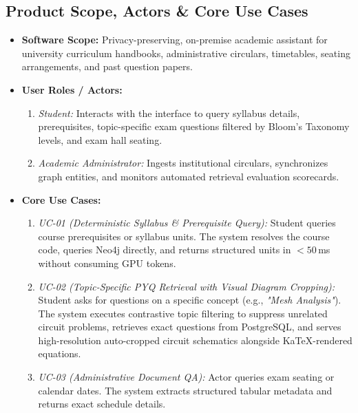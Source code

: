 \documentclass[11pt, a4paper]{article}
\begin{document}
\subsection{Product Scope, Actors \& Core Use Cases}
\begin{itemize}[noitemsep, topsep=2pt]
    \item \textbf{Software Scope:} Privacy-preserving, on-premise academic assistant for university curriculum handbooks, administrative circulars, timetables, seating arrangements, and past question papers.
    \item \textbf{User Roles / Actors:}
    \begin{enumerate}[noitemsep]
        \item \textit{Student:} Interacts with the interface to query syllabus details, prerequisites, topic-specific exam questions filtered by Bloom's Taxonomy levels, and exam hall seating.
        \item \textit{Academic Administrator:} Ingests institutional circulars, synchronizes graph entities, and monitors automated retrieval evaluation scorecards.
    \end{enumerate}
    \item \textbf{Core Use Cases:}
    \begin{enumerate}[noitemsep, topsep=2pt]
        \item \textit{UC-01 (Deterministic Syllabus \& Prerequisite Query):} Student queries course prerequisites or syllabus units. The system resolves the course code, queries Neo4j directly, and returns structured units in $<50$\,ms without consuming GPU tokens.
        \item \textit{UC-02 (Topic-Specific PYQ Retrieval with Visual Diagram Cropping):} Student asks for questions on a specific concept (e.g., \textit{"Mesh Analysis"}). The system executes contrastive topic filtering to suppress unrelated circuit problems, retrieves exact questions from PostgreSQL, and serves high-resolution auto-cropped circuit schematics alongside KaTeX-rendered equations.
        \item \textit{UC-03 (Administrative Document QA):} Actor queries exam seating or calendar dates. The system extracts structured tabular metadata and returns exact schedule details.
    \end{enumerate}
\end{itemize}
\end{document}
